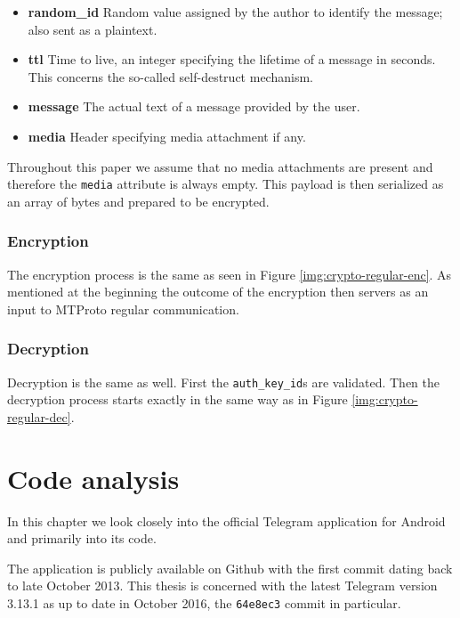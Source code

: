 \documentclass[thesis=M,english]{FITthesis}[2012/10/20]
\begin{document}
\begin{itemize}
	\item \textbf{random\_id} Random value assigned by the author to identify the message; also sent as a plaintext.
	\item  \textbf{ttl} Time to live, an integer specifying the lifetime of a message in seconds. This concerns the so-called self-destruct mechanism.
	\item \textbf{message} The actual text of a message provided by the user.
	\item \textbf{media} Header specifying media attachment if any.
\end{itemize}

Throughout this paper we assume that no media attachments are present and therefore the \texttt{media} attribute is always empty. This payload is then serialized as an array of bytes and prepared to be encrypted.

\subsection{Encryption}\label{crypto-secret-enc}

The encryption process is the same as seen in Figure \ref{img:crypto-regular-enc}. As mentioned at the beginning the outcome of the encryption then servers as an input to MTProto regular communication.

\subsection{Decryption}\label{crypto-secret-dec}

Decryption is the same as well. First the \texttt{auth\_key\_id}s are validated.  Then the decryption process starts exactly in the same way as in Figure \ref{img:crypto-regular-dec}.





\chapter{Code analysis}\label{code}

In this chapter we look closely into the official Telegram application for Android and primarily into its code.

The application is publicly available on Github \cite{github-telegram} with the first commit dating back to late October 2013. This thesis is concerned with the latest Telegram version 3.13.1 as up to date in October 2016, the \texttt{64e8ec3} commit in particular.
\end{document}
